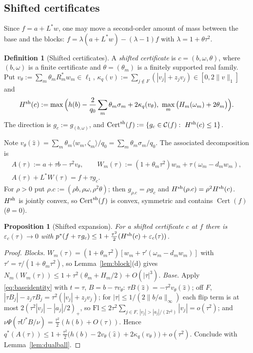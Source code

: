 \documentclass[10pt]{amsart}
\newtheorem{proposition}[theorem]{Proposition}
\theoremstyle{definition}
\newtheorem{definition}[theorem]{Definition}
\theoremstyle{remark}
\newcommand{\Cset}{\mathcal C}
\newcommand{\Cert}{\operatorname{Cert}}
\newcommand{\zh}{\hat z}
\newcommand{\ip}[2]{\langle #1,#2\rangle}
\begin{document}
\subsection{Shifted certificates}
Since $f=a+L^*w$, one may move a second-order amount of mass between the
base and the blocks: $f=\lambda(a+L^*w)-(\lambda-1)f$ with
$\lambda=1+\theta\tau^2$.

\begin{definition}[Shifted certificates]\label{def:shifted}
A \emph{shifted certificate} is $c=(b,\omega,\theta)$, where $(b,\omega)$ is
a finite certificate and $\theta=(\theta_m)$ is a finitely supported real
family.  Put $v_\theta:=\sum_m\theta_mR_m^*w_m\in\ell_1$,
$\kappa_q(v):=\sum_{j\notin F}(|v_j|+z_jv_j)\in[0,2\|v\|_1]$ and
\[
 H^{\rm sh}(c):=\max\Big(h(b)-\frac2{q_0}\sum_m\theta_m\sigma_m
 +2\kappa_q(v_\theta),\ \max_m\big(H_m(\omega_m)+2\theta_m\big)\Big).
\]
The direction is $g_c:=g_{(b,\omega)}$, and
$\Cert^{\rm sh}(f):=\{g_c\in\Cset(f):\ H^{\rm sh}(c)\le1\}$.
\end{definition}

Note $v_\theta(\zh)=\sum_m\theta_m\ip{w_m}{\zeta_m}/q_0=\sum_m\theta_m
\sigma_m/q_0$.  The associated decomposition is
\begin{equation}\label{eq:shiftdec}
 \begin{gathered}
 A(\tau):=a+\tau b-\tau^2v_\theta,\qquad W_m(\tau):=(1+\theta_m\tau^2)w_m+
 \tau(\omega_m-d_mw_m),\\
 A(\tau)+L^*W(\tau)=f+\tau g_c.
 \end{gathered}
\end{equation}
For $\rho>0$ put $\rho.c:=(\rho b,\rho\omega,\rho^2\theta)$; then
$g_{\rho.c}=\rho g_c$ and $H^{\rm sh}(\rho.c)=\rho^2H^{\rm sh}(c)$.
$H^{\rm sh}$ is jointly convex, so $\Cert^{\rm sh}(f)$ is convex,
symmetric and contains $\Cert(f)$ ($\theta=0$).

\begin{proposition}[Shifted expansion]\label{prop:shifted}
For a shifted certificate $c$ at $f$ there is $\varepsilon_c(\tau)\to0$ with
$p^*(f+\tau g_c)\le1+\frac{\tau^2}2(H^{\rm sh}(c)+\varepsilon_c(\tau))$.
\end{proposition}

\begin{proof}
\emph{Blocks.} $W_m(\tau)=(1+\theta_m\tau^2)[w_m+\tau'(\omega_m-d_mw_m)]$
with $\tau'=\tau/(1+\theta_m\tau^2)$, so Lemma~\ref{lem:block}(d) gives
$N_m(W_m(\tau))\le1+\tau^2(\theta_m+H_m/2)+O(|\tau|^3)$.
\emph{Base.} Apply \eqref{eq:baseidentity} with $t=\tau$,
$B=b-\tau v_\theta$: $\tau B(\zh)=-\tau^2v_\theta(\zh)$; off $F$,
$|\tau B_j|-z_j\tau B_j=\tau^2(|v_j|+z_jv_j)$; for $|\tau|\le
1/(2\|b/a\|_\infty)$ each flip term is at most
$2(\tau^2|v_j|-|a_j|/2)_+$, so
$\mathrm{Fl}\le2\tau^2\sum_{j\in F,\,|v_j|>|a_j|/(2\tau^2)}|v_j|=o(\tau^2)$;
and $\nu\Psi(\tau U^*B/\nu)=\frac{\tau^2}2(h(b)+O(\tau))$.  Hence
$q^*(A(\tau))\le1+\frac{\tau^2}2\big(h(b)-2v_\theta(\zh)+2\kappa_q(v_\theta)
\big)+o(\tau^2)$.  Conclude with Lemma~\ref{lem:dualball}.
\end{proof}
\end{document}

